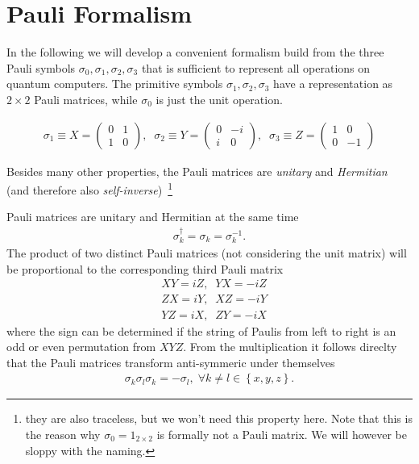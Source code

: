 \section{Pauli Formalism}
In the following we will develop a convenient formalism build from the three Pauli symbols ${\sigma_0,\sigma_1,\sigma_2,\sigma_3}$ that is sufficient to represent all operations on quantum computers. 
The primitive symbols ${\sigma_1,\sigma_2,\sigma_3}$ have a representation as $2\times 2$ Pauli matrices, while $\sigma_0$ is just the unit operation.
\begin{def*}
\begin{align}
        \sigma_1\equiv X = \begin{pmatrix}
        0 & 1 \\ 1 & 0
    \end{pmatrix}, \;\;        \sigma_2\equiv Y = \begin{pmatrix}
        0 & -i \\ i & 0
    \end{pmatrix},\;\;        \sigma_3\equiv Z=  \begin{pmatrix}
        1 & 0 \\ 0 & -1
    \end{pmatrix}
\end{align}
\end{def*}
Besides many other properties, the Pauli matrices are \textit{unitary} and \textit{Hermitian} (and therefore also \textit{self-inverse})~\footnote{they are also traceless, but we won't need this property here. Note that this is the reason why $\sigma_0 = 1_{2\times 2}$ is formally not a Pauli matrix. We will however be sloppy with the naming.}
\begin{theorem*}
Pauli matrices are unitary and Hermitian at the same time
\begin{align}
    \sigma_k ^\dagger = \sigma_k = \sigma_k^{-1}.\label{eq:pauli-algebra}
\end{align}
The product of two distinct Pauli matrices (not considering the unit matrix) will be proportional to the corresponding third Pauli matrix 
\begin{align}
    &XY = iZ, \;\; YX = -iZ\\
    &ZX = iY, \;\; XZ = -iY\\
    &YZ = iX, \;\; ZY = -iX
\end{align}
where the sign can be determined if the string of Paulis from left to right is an odd or even permutation from $XYZ$.
From the multiplication it follows direclty that the Pauli matrices transform anti-symmeric under themselves
\begin{align}
    \sigma_k \sigma_l \sigma_k = - \sigma_l,\; \forall k\neq l\in \left\{x,y,z\right\}.
\end{align}
\end{theorem*}
